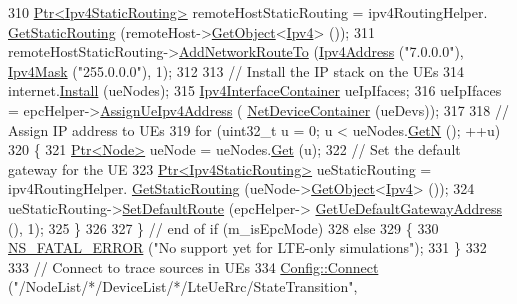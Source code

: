 \begin{DoxyCode}
310       \hyperlink{classns3_1_1Ptr}{Ptr<Ipv4StaticRouting>} remoteHostStaticRouting = ipv4RoutingHelper.
      \hyperlink{classns3_1_1Ipv4StaticRoutingHelper_a731206e50d305695dac7fb2ef963a4bb}{GetStaticRouting} (remoteHost->\hyperlink{classns3_1_1Object_a13e18c00017096c8381eb651d5bd0783}{GetObject}<\hyperlink{classns3_1_1Ipv4}{Ipv4}> ());
311       remoteHostStaticRouting->\hyperlink{classns3_1_1Ipv4StaticRouting_a8bf5eaa7ba49fe33c78c70d5560b6c39}{AddNetworkRouteTo} (\hyperlink{classns3_1_1Ipv4Address}{Ipv4Address} (\textcolor{stringliteral}{"7.0.0.0"}), 
      \hyperlink{classns3_1_1Ipv4Mask}{Ipv4Mask} (\textcolor{stringliteral}{"255.0.0.0"}), 1);
312 
313       \textcolor{comment}{// Install the IP stack on the UEs}
314       internet.\hyperlink{classns3_1_1InternetStackHelper_a6645b412f31283d2d9bc3d8a95cebbc0}{Install} (ueNodes);
315       \hyperlink{classns3_1_1Ipv4InterfaceContainer}{Ipv4InterfaceContainer} ueIpIfaces;
316       ueIpIfaces = epcHelper->\hyperlink{classns3_1_1PointToPointEpcHelper_a11102d32127163fdcc47c44623d4f0cc}{AssignUeIpv4Address} (
      \hyperlink{classns3_1_1NetDeviceContainer}{NetDeviceContainer} (ueDevs));
317 
318       \textcolor{comment}{// Assign IP address to UEs}
319       \textcolor{keywordflow}{for} (uint32\_t u = 0; u < ueNodes.\hyperlink{classns3_1_1NodeContainer_aed647ac56d0407a7706aba02eb44b951}{GetN} (); ++u)
320         \{
321           \hyperlink{classns3_1_1Ptr}{Ptr<Node>} ueNode = ueNodes.\hyperlink{classns3_1_1NodeContainer_a9ed96e2ecc22e0f5a3d4842eb9bf90bf}{Get} (u);
322           \textcolor{comment}{// Set the default gateway for the UE}
323           \hyperlink{classns3_1_1Ptr}{Ptr<Ipv4StaticRouting>} ueStaticRouting = ipv4RoutingHelper.
      \hyperlink{classns3_1_1Ipv4StaticRoutingHelper_a731206e50d305695dac7fb2ef963a4bb}{GetStaticRouting} (ueNode->\hyperlink{classns3_1_1Object_a13e18c00017096c8381eb651d5bd0783}{GetObject}<\hyperlink{classns3_1_1Ipv4}{Ipv4}> ());
324           ueStaticRouting->\hyperlink{classns3_1_1Ipv4StaticRouting_aee30fa3246c2b42f122dabdff2725331}{SetDefaultRoute} (epcHelper->
      \hyperlink{classns3_1_1PointToPointEpcHelper_a9160d83b92d5ea373abcd627f5d784f5}{GetUeDefaultGatewayAddress} (), 1);
325         \}
326 
327     \} \textcolor{comment}{// end of if (m\_isEpcMode)}
328   \textcolor{keywordflow}{else}
329     \{
330       \hyperlink{group__fatal_ga5131d5e3f75d7d4cbfd706ac456fdc85}{NS\_FATAL\_ERROR} (\textcolor{stringliteral}{"No support yet for LTE-only simulations"});
331     \}
332 
333   \textcolor{comment}{// Connect to trace sources in UEs}
334   \hyperlink{group__config_ga4014f151241cd0939b6cb64409605736}{Config::Connect} (\textcolor{stringliteral}{"/NodeList/*/DeviceList/*/LteUeRrc/StateTransition"},

\end{DoxyCode}
